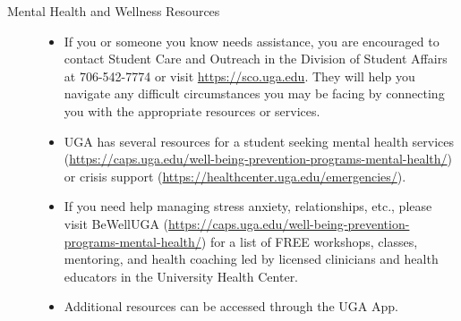 \documentclass[11pt, a4paper]{article}
\begin{document}
\begin{description}
\item[Mental Health and Wellness Resources]
  \begin{itemize}
  \item If you or someone you know needs assistance, you are
    encouraged to contact Student Care and Outreach in the Division of
    Student Affairs at 706-542-7774 or visit
    \url{https://sco.uga.edu}. They will help you navigate any
    difficult circumstances you may be facing by connecting you with
    the appropriate resources or services.
  \item UGA has several resources for a student seeking mental health
    services
    (\url{https://caps.uga.edu/well-being-prevention-programs-mental-health/})
    or crisis support
    (\url{https://healthcenter.uga.edu/emergencies/}).
  \item If you need help managing stress anxiety, relationships, etc.,
    please visit BeWellUGA
    (\url{https://caps.uga.edu/well-being-prevention-programs-mental-health/})
    for a list of FREE workshops, classes, mentoring, and health
    coaching led by licensed clinicians and health educators in the
    University Health Center.
  \item Additional resources can be accessed through the UGA App. 
  \end{itemize}

\end{description}

\clearpage

\end{document}
